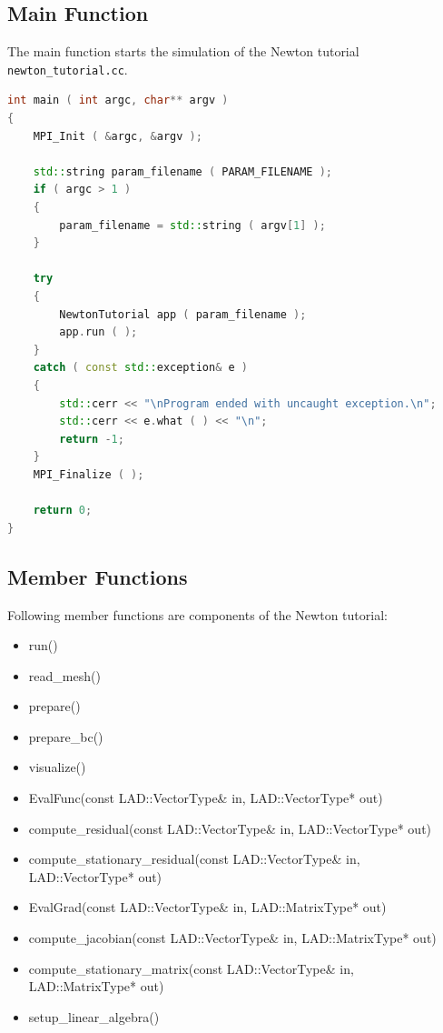 \documentclass[a4paper, 11pt, twoside]{article}
\begin{document}
\subsection{Main Function}
The main function starts the simulation of the Newton tutorial \verb+newton_tutorial.cc+.
\begin{lstlisting}[language=C++, basicstyle={\footnotesize, \ttfamily}, keywordstyle=\color{blue}, numbers=none, tabsize=4]    
int main ( int argc, char** argv )
{
    MPI_Init ( &argc, &argv );

    std::string param_filename ( PARAM_FILENAME );
    if ( argc > 1 )
    {
        param_filename = std::string ( argv[1] );
    }

    try
    {
        NewtonTutorial app ( param_filename );
        app.run ( );
    }
    catch ( const std::exception& e )
    {
        std::cerr << "\nProgram ended with uncaught exception.\n";
        std::cerr << e.what ( ) << "\n";
        return -1;
    }
    MPI_Finalize ( );

    return 0;
}
\end{lstlisting}

\subsection{Member Functions}
Following member functions are components of the Newton tutorial:
\begin{itemize}
\item run()
\item read\_mesh()
\item prepare()
\item prepare\_bc()
\item visualize()
\item EvalFunc(const LAD::VectorType\& in, LAD::VectorType* out)
\item compute\_residual(const LAD::VectorType\& in, LAD::VectorType* out)
\item compute\_stationary\_residual(const LAD::VectorType\& in, LAD::VectorType* out)
\item EvalGrad(const LAD::VectorType\& in, LAD::MatrixType* out)
\item compute\_jacobian(const LAD::VectorType\& in, LAD::MatrixType* out)
\item compute\_stationary\_matrix(const LAD::VectorType\& in, LAD::MatrixType* out)
\item setup\_linear\_algebra()
\end{itemize}
\end{document}
